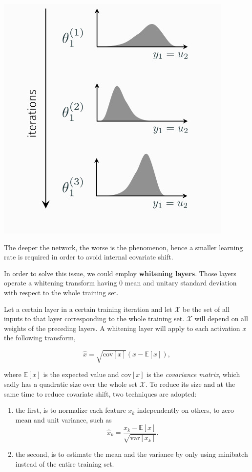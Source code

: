 \documentclass[10pt]{report}
\begin{document}
\begin{center}
\includegraphics[scale=0.4]{./pics/cnn/batch-normalization.jpg}
\end{center}

The deeper the network, the worse is the phenomenon, hence a smaller
learning rate is required in order to avoid internal covariate shift.

In order to solve this issue, we could employ \textbf{whitening layers}. Those
layers operate a whitening transform having \(0\) mean and unitary
standard deviation with respect to the whole training set.

Let a certain layer in a certain training iteration and let
\(\mathcal{X}\) be the set of all inputs to that layer corresponding to
the whole training set. \(\mathcal{X}\) will depend on all weights of
the preceding layers. A whitening layer will apply to each activation
\(x\) the following transform,

\[ \hat{x} = \sqrt{\mbox{cov}[x]}(x - \mathbb{E}[x]),\]

where \(\mathbb{E}[x]\) is the expected value and \(\mbox{cov}[x]\) is
the \emph{covariance matrix}, which sadly has a quadratic size over the whole
set \(\mathcal{X}\). To reduce its size and at the same time to reduce
covariate shift, two techniques are adopted:

\begin{enumerate}
\item the first, is to normalize each feature \(x_k\) independently on others, to zero mean
and unit variance, such as
\[\hat{x}_ k = \frac{x_k - \mathbb{E}[x]}{\sqrt{\mbox{var} [x_k]}}.\]
\item the second, is to estimate the mean and the variance by only using minibatch instead of
the entire training set.
\end{enumerate}
\end{document}

